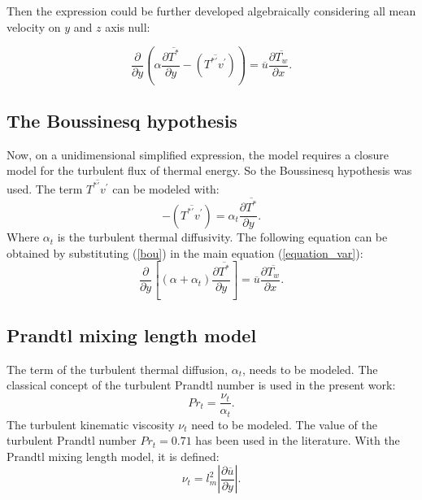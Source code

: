 \documentclass[10pt]{article} %
\begin{document}
Then the expression could be further developed algebraically considering all mean velocity on $y$ and $z$ axis null:

\begin{equation}\label{equation_var}
{\frac{\partial{}}{\partial{y}}} \left(\alpha {\frac{\partial{\overline{T^\ast}}}{\partial{y}}}   
- \left(\overline{ T^{\ast\prime} v^\prime}\right) \right)
= 
\overline{u}\frac{\partial{\overline{T_w}}}{\partial{x}}.
\end{equation}



\subsection{The Boussinesq hypothesis}

Now, on a unidimensional simplified expression, the model requires a closure model for the turbulent flux of thermal energy. 
So the Boussinesq hypothesis was used. The term $\overline{T^{\ast\prime}  v^\prime}$ can be modeled with:
\begin{equation}\label{bou}
-\left(\overline{ T^{\ast\prime}  v^\prime}\right) = 
\alpha_t \frac{\partial{\overline{T^\ast}}}{\partial{y}}.
\end{equation}
Where $\alpha_t$ is the turbulent thermal diffusivity. The following equation can be obtained by substituting (\ref{bou}) in the main equation (\ref{equation_var}):
\\
\begin{equation}\label{oiiiii}
{\frac{\partial{}}{\partial{y}}} \left[(\alpha + \alpha_t)  \frac{\partial \overline{T^\ast}}{\partial y} \right]
= 
\overline{u}\frac{\partial{\overline{T_w}}}{\partial{x}}. 
\end{equation}

\subsection{Prandtl mixing length model} 

The term of the turbulent thermal diffusion, $\alpha_t$, needs to be modeled. 
The classical concept of the turbulent Prandtl number is used in the present work:
\begin{equation}
Pr_t = \frac{\nu_t}{\alpha_t}.
\end{equation} 
The turbulent kinematic viscosity $ \nu_t $ need to be modeled. The value of the turbulent Prandtl number $ Pr_t = 0.71 $ has been used in the literature.
With the Prandtl mixing length model, it is defined:
\begin{equation}
\nu_t = {l^2_m} \left| \frac{\partial \overline{u}}{\partial y} \right|.
\end{equation}
\end{document}
